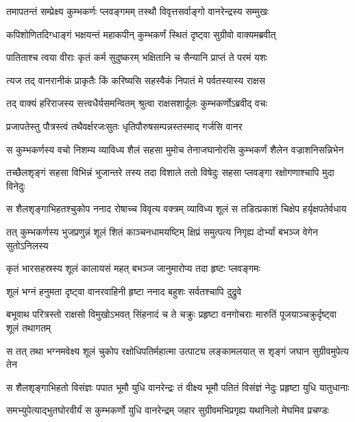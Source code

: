 \twolineshloka
{तमापतन्तं सम्प्रेक्ष्य कुम्भकर्णः प्लवङ्गमम्}
{तस्थौ विवृत्तसर्वाङ्गो वानरेन्द्रस्य सम्मुखः} %

\twolineshloka
{कपिशोणितदिग्धाङ्गं भक्षयन्तं महाकपीन्}
{कुम्भकर्णं स्थितं दृष्ट्वा सुग्रीवो वाक्यमब्रवीत्} %

\twolineshloka
{पातिताश्च त्वया वीराः कृतं कर्म सुदुष्करम्}
{भक्षितानि च सैन्यानि प्राप्तं ते परमं यशः} %

\twolineshloka
{त्यज तद् वानरानीकं प्राकृतैः किं करिष्यसि}
{सहस्वैकं निपातं मे पर्वतस्यास्य राक्षस} %

\twolineshloka
{तद् वाक्यं हरिराजस्य सत्त्वधैर्यसमन्वितम्}
{श्रुत्वा राक्षसशार्दूलः कुम्भकर्णोऽब्रवीद् वचः} %

\twolineshloka
{प्रजापतेस्तु पौत्रस्त्वं तथैवर्क्षरजःसुतः}
{धृतिपौरुषसम्पन्नस्तस्माद् गर्जसि वानर} %

\twolineshloka
{स कुम्भकर्णस्य वचो निशम्य व्याविध्य शैलं सहसा मुमोच}
{तेनाजघानोरसि कुम्भकर्णं शैलेन वज्राशनिसन्निभेन} %

\twolineshloka
{तच्छैलशृङ्गं सहसा विभिन्नं भुजान्तरे तस्य तदा विशाले}
{ततो विषेदुः सहसा प्लवङ्गा रक्षोगणाश्चापि मुदा विनेदुः} %

\twolineshloka
{स शैलशृङ्गाभिहतश्चुकोप ननाद रोषाच्च विवृत्य वक्त्रम्}
{व्याविध्य शूलं स तडित्प्रकाशं चिक्षेप हर्यृक्षपतेर्वधाय} %

\twolineshloka
{तत् कुम्भकर्णस्य भुजप्रणुन्नं शूलं शितं काञ्चनधामयष्टिम्}
{क्षिप्रं समुत्पत्य निगृह्य दोर्भ्यां बभञ्ज वेगेन सुतोऽनिलस्य} %

\twolineshloka
{कृतं भारसहस्रस्य शूलं कालायसं महत्}
{बभञ्ज जानुमारोप्य तदा हृष्टः प्लवङ्गमः} %

\twolineshloka
{शूलं भग्नं हनुमता दृष्ट्वा वानरवाहिनी}
{हृष्टा ननाद बहुशः सर्वतश्चापि दुद्रुवे} %

\threelineshloka
{बभूवाथ परित्रस्तो राक्षसो विमुखोऽभवत्}
{सिंहनादं च ते चक्रुः प्रहृष्टा वनगोचराः}
{मारुतिं पूजयाञ्चक्रुर्दृष्ट्वा शूलं तथागतम्} %

\twolineshloka
{स तत् तथा भग्नमवेक्ष्य शूलं चुकोप रक्षोधिपतिर्महात्मा}
{उत्पाट्य लङ्कामलयात् स शृङ्गं जघान सुग्रीवमुपेत्य तेन} %

\twolineshloka
{स शैलशृङ्गाभिहतो विसंज्ञः पपात भूमौ युधि वानरेन्द्रः}
{तं वीक्ष्य भूमौ पतितं विसंज्ञं नेदुः प्रहृष्टा युधि यातुधानाः} %

\twolineshloka
{समभ्युपेत्याद्भुतघोरवीर्यं स कुम्भकर्णो युधि वानरेन्द्रम्}
{जहार सुग्रीवमभिप्रगृह्य यथानिलो मेघमिव प्रचण्डः} %

